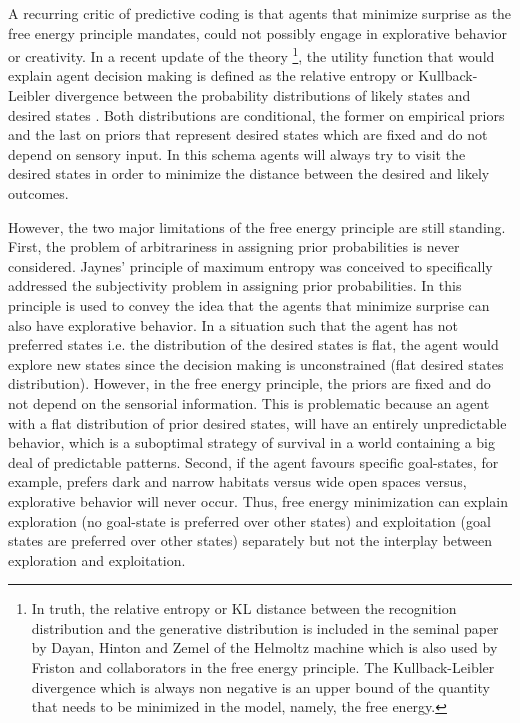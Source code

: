 \documentclass[11pt, onecolumn]{article}
\begin{document}
A recurring critic of predictive coding is that agents that minimize surprise as the free energy principle mandates, could not possibly engage in explorative  behavior or creativity. In a recent update of the theory \footnote{In truth, the relative entropy or KL distance between the recognition distribution and the generative distribution is included in the seminal paper by Dayan, Hinton and Zemel of the Helmoltz machine \citep{dayan_helmholtz_1995} which is also used by Friston and collaborators in the free energy principle. The Kullback-Leibler divergence which is always non negative is an upper
bound of the quantity that needs to be minimized in the model, namely, the free energy.}, the utility function that would explain agent decision making is defined as the relative entropy or Kullback-Leibler divergence between the probability distributions of likely states and desired states \citep{schwartenbeck_exploration_2013}. Both distributions are conditional, the former on empirical priors and the last on priors that represent desired states which are fixed and do not depend on sensory input. In this schema agents will always try to visit the desired states in order to minimize the distance between the desired and likely outcomes. 

However, the two major limitations  of the free energy principle are still standing. First, the problem of arbitrariness in assigning prior probabilities is 
never considered. Jaynes' \citep{Jaynes68priorprobabilities} principle of maximum entropy was conceived to specifically addressed the subjectivity problem in assigning prior probabilities. In \citep{schwartenbeck_exploration_2013} this principle is used to convey the idea that the agents that minimize surprise can also have explorative behavior. 
In a situation such that the agent has not preferred states i.e. the distribution of the desired states is flat, the agent would explore new states since the decision making is unconstrained (flat desired states distribution). However, in the free energy principle, the priors are fixed and do not depend on the sensorial information. This is problematic because an agent with a flat distribution of prior desired states, will have an entirely unpredictable behavior, which is a suboptimal strategy of survival in a world containing a big deal of predictable patterns. Second, if the agent favours specific goal-states, for example, prefers dark and narrow habitats versus wide open spaces versus, explorative behavior will never occur. Thus, free energy minimization can explain exploration (no goal-state is preferred over other states) and exploitation (goal states are preferred over other states) separately but not the interplay between exploration and exploitation. 
\end{document}
